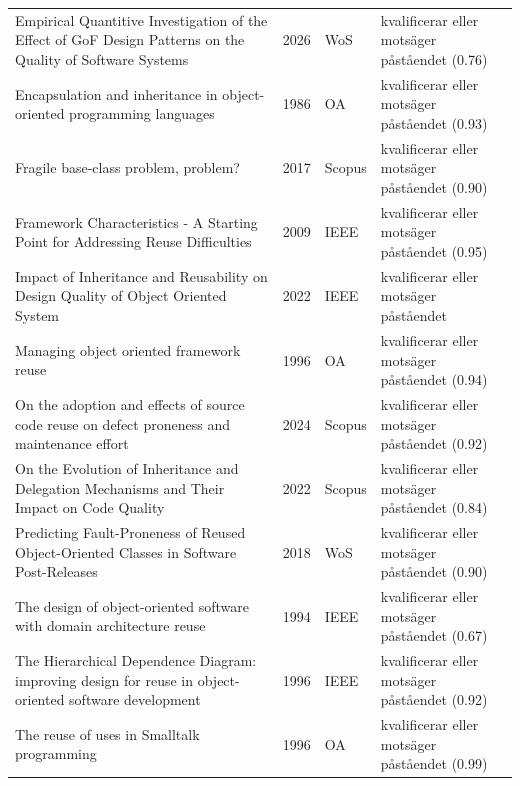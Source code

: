 \begin{longtable}{@{}%
  >{\raggedright\arraybackslash}p{}c%
  >{\raggedright\arraybackslash}p{}%
  >{\raggedright\arraybackslash}p{}@{}}
Empirical Quantitive Investigation of the Effect of GoF Design Patterns on the Quality of Software Systems & 2026 & WoS & kvalificerar eller motsäger påståendet (0.76) \\
Encapsulation and inheritance in object-oriented programming languages & 1986 & OA & kvalificerar eller motsäger påståendet (0.93) \\
Fragile base-class problem, problem? & 2017 & Scopus & kvalificerar eller motsäger påståendet (0.90) \\
Framework Characteristics - A Starting Point for Addressing Reuse Difficulties & 2009 & IEEE & kvalificerar eller motsäger påståendet (0.95) \\
Impact of Inheritance and Reusability on Design Quality of Object Oriented System & 2022 & IEEE & kvalificerar eller motsäger påståendet \\
Managing object oriented framework reuse & 1996 & OA & kvalificerar eller motsäger påståendet (0.94) \\
On the adoption and effects of source code reuse on defect proneness and maintenance effort & 2024 & Scopus & kvalificerar eller motsäger påståendet (0.92) \\
On the Evolution of Inheritance and Delegation Mechanisms and Their Impact on Code Quality & 2022 & Scopus & kvalificerar eller motsäger påståendet (0.84) \\
Predicting Fault-Proneness of Reused Object-Oriented Classes in Software Post-Releases & 2018 & WoS & kvalificerar eller motsäger påståendet (0.90) \\
The design of object-oriented software with domain architecture reuse & 1994 & IEEE & kvalificerar eller motsäger påståendet (0.67) \\
The Hierarchical Dependence Diagram: improving design for reuse in object-oriented software development & 1996 & IEEE & kvalificerar eller motsäger påståendet (0.92) \\
The reuse of uses in Smalltalk programming & 1996 & OA & kvalificerar eller motsäger påståendet (0.99) \\
\end{longtable}
\endgroup
